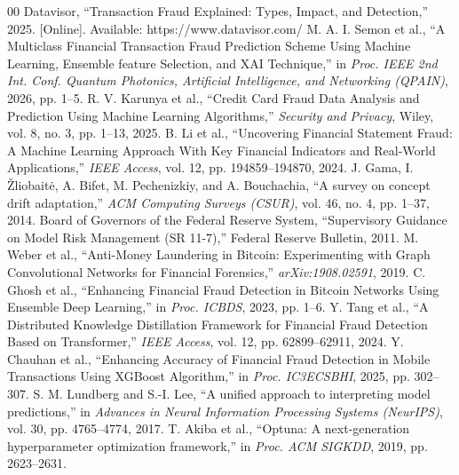 \documentclass[conference]{IEEEtran}
\begin{document}
\begin{thebibliography}{00}
 Datavisor, ``Transaction Fraud Explained: Types, Impact, and Detection,'' 2025. [Online]. Available: https://www.datavisor.com/
 M. A. I. Semon et al., ``A Multiclass Financial Transaction Fraud Prediction Scheme Using Machine Learning, Ensemble feature Selection, and XAI Technique,'' in \textit{Proc. IEEE 2nd Int. Conf. Quantum Photonics, Artificial Intelligence, and Networking (QPAIN)}, 2026, pp. 1--5.
 R. V. Karunya et al., ``Credit Card Fraud Data Analysis and Prediction Using Machine Learning Algorithms,'' \textit{Security and Privacy}, Wiley, vol. 8, no. 3, pp. 1--13, 2025.
 B. Li et al., ``Uncovering Financial Statement Fraud: A Machine Learning Approach With Key Financial Indicators and Real-World Applications,'' \textit{IEEE Access}, vol. 12, pp. 194859--194870, 2024.
 J. Gama, I. Žliobaitė, A. Bifet, M. Pechenizkiy, and A. Bouchachia, ``A survey on concept drift adaptation,'' \textit{ACM Computing Surveys (CSUR)}, vol. 46, no. 4, pp. 1--37, 2014.
 Board of Governors of the Federal Reserve System, ``Supervisory Guidance on Model Risk Management (SR 11-7),'' Federal Reserve Bulletin, 2011.
 M. Weber et al., ``Anti-Money Laundering in Bitcoin: Experimenting with Graph Convolutional Networks for Financial Forensics,'' \textit{arXiv:1908.02591}, 2019.
 C. Ghosh et al., ``Enhancing Financial Fraud Detection in Bitcoin Networks Using Ensemble Deep Learning,'' in \textit{Proc. ICBDS}, 2023, pp. 1--6.
 Y. Tang et al., ``A Distributed Knowledge Distillation Framework for Financial Fraud Detection Based on Transformer,'' \textit{IEEE Access}, vol. 12, pp. 62899--62911, 2024.
 Y. Chauhan et al., ``Enhancing Accuracy of Financial Fraud Detection in Mobile Transactions Using XGBoost Algorithm,'' in \textit{Proc. IC3ECSBHI}, 2025, pp. 302--307.
 S. M. Lundberg and S.-I. Lee, ``A unified approach to interpreting model predictions,'' in \textit{Advances in Neural Information Processing Systems (NeurIPS)}, vol. 30, pp. 4765--4774, 2017.
 T. Akiba et al., ``Optuna: A next-generation hyperparameter optimization framework,'' in \textit{Proc. ACM SIGKDD}, 2019, pp. 2623--2631.
\end{thebibliography}
\end{document}
